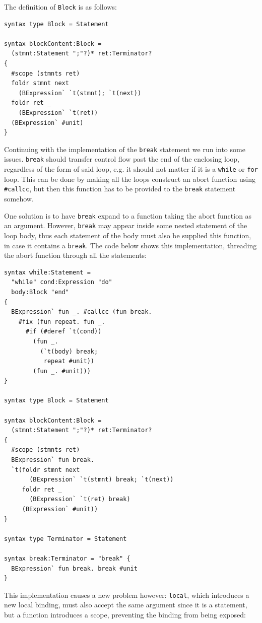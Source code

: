 \documentclass{kththesis}
\begin{document}
The definition of \texttt{Block} is as follows:

\begin{verbatim}
syntax type Block = Statement

syntax blockContent:Block =
  (stmnt:Statement ";"?)* ret:Terminator?
{
  #scope (stmnts ret)
  foldr stmnt next
    (BExpression` `t(stmnt); `t(next))
  foldr ret _
    (BExpression` `t(ret))
  (BExpression` #unit)
}
\end{verbatim}

Continuing with the implementation of the \texttt{break} statement we run into some issues. \texttt{break} should transfer control flow past the end of the enclosing loop, regardless of the form of said loop, e.g. it should not matter if it is a \texttt{while} or \texttt{for} loop. This can be done by making all the loops construct an abort function using \texttt{#callcc}, but then this function has to be provided to the \texttt{break} statement somehow.

One solution is to have \texttt{break} expand to a function taking the abort function as an argument. However, \texttt{break} may appear inside some nested statement of the loop body, thus each statement of the body must also be supplied this function, in case it contains a \texttt{break}. The code below shows this implementation, threading the abort function through all the statements:

\begin{verbatim}
syntax while:Statement =
  "while" cond:Expression "do"
  body:Block "end"
{
  BExpression` fun _. #callcc (fun break.
    #fix (fun repeat. fun _.
      #if (#deref `t(cond))
        (fun _.
          (`t(body) break;
           repeat #unit))
        (fun _. #unit)))
}

syntax type Block = Statement

syntax blockContent:Block =
  (stmnt:Statement ";"?)* ret:Terminator?
{
  #scope (stmnts ret)
  BExpression` fun break.
  `t(foldr stmnt next
       (BExpression` `t(stmnt) break; `t(next))
     foldr ret _
       (BExpression` `t(ret) break)
     (BExpression` #unit))
}

syntax type Terminator = Statement

syntax break:Terminator = "break" {
  BExpression` fun break. break #unit
}
\end{verbatim}

This implementation causes a new problem however: \texttt{local}, which introduces a new local binding, must also accept the same argument since it is a statement, but a function introduces a scope, preventing the binding from being exposed:
\end{document}
